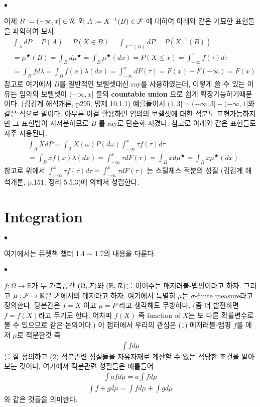 \documentclass[12pt,oneside,english,a4paper]{article}
\def\ck{\paragraph{\Large$\bullet$}\Large}
\begin{document}
\ck 이제 $B:=(-\infty,x] \in {\cal R}$ 와 $A:=X^{-1}(B) \in {\cal F}$ 에 대하여 아래와 같은 기묘한 표현들을 파악하여 보자. 
\begin{align*}
& \int_A dP = P(A) = P(X \in B) =  \int_{X^{-1}(B)} dP = P(X^{-1}(B)) \\
& = \mu^{\bigstar}(B) = \int_B d\mu^{\bigstar} = \int_B \mu^{\bigstar}(dx) = P(X \leq x) = \int_{-\infty}^{x} f(\tau)d\tau \\ 
& = \int_{B} fd\lambda=\int_{B} f(x)\lambda(dx)= \int_{-\infty}^{x}dF(\tau) =F(x)-F(-\infty)=F(x)
\end{align*}
참고로 여기에서 $B$를 일반적인 보렐셋대신 ray를 사용하였는데, 이렇게 쓸 수 있는 이유는 임의의 보렐셋이 $(-\infty,x]$ 들의 \textbf{countable union} 으로 쉽게 확장가능하기때문이다. (김김계 해석개론, p295, 명제 10.1.1) 예를들어서 $(1,3]=(-\infty,3] - (-\infty,1]$와 같은 식으로 말이다. 아무튼 이걸 활용하면 임의의 보렐셋에 대한 적분도 표현가능하지만 그 표현법이 지저분하므로 $B$ 를 ray로 단순화 시켰다. 참고로 아래와 같은 표현들도 자주 사용된다. 
\begin{align*}
& \int_A X dP=\int_A X(\omega)P(d \omega) 
\int_{-\infty}^{x}\tau f(\tau)d\tau \\
& = \int_B x f(x) \lambda(dx) = \int_{-\infty}^{x} \tau dF(\tau) = \int_B x d{\mu}^{\bigstar} = \int_B x \mu^{\bigstar}(dx)
\end{align*}
참고로 위에서 $\int_{-\infty}^{x}\tau f(\tau)d\tau=\int_{-\infty}^{x} \tau dF(\tau)$ 는 스틸체스 적분의 성질 (김김계 해석개론, p.151, 정리 5.5.3)에 의해서 성립한다. 

\section{Integration}
\ck 여기에서는 듀렛책 챕터 1.4 $\sim$ 1.7의 내용을 다룬다. 

\ck $f:\Omega \rightarrow \mathbb{R}$가 두 가측공간 $(\Omega,{\cal F})$와 $(\mathbb{R},{\cal R})$를 이어주는 매저러블-맵핑이라고 하자. 그리고 $\mu:{\cal F} \rightarrow \mathbb{R}$은 ${\cal F}$에서의 메저라고 하자. 여기에서 특별히 $\mu$는 $\sigma$-finite measure라고 정의한다. 당분간은 $f=X$ 이고 $\mu=P$ 라고 생각해도 무방하다. (좀 더 발전하면 $f=f(X)$라고 두기도 한다. 어차피 $f(X)$ 즉 function of $X$는 또 다른 확률변수로 볼 수 있으므로 같은 논의이다.) 이 챕터에서 우리의 관심은 (1) 메저러블-맵핑 $f$를 메저 $\mu$로 적분한것 즉 
\begin{align*}
\int f d \mu
\end{align*}
를 잘 정의하고 (2) 적분관련 성질들을 자유자재로 계산할 수 있는 적당한 조건을 알아보는 것이다. 여기에서 적분관련 성질들은 예를들어 
\begin{align*}
\int af d\mu = a \int f d \mu 
\end{align*} 
\begin{align*}
\int f+g d\mu = \int f d \mu + \int g d \mu 
\end{align*} 
와 같은 것들을 의미한다. 
\end{document}

